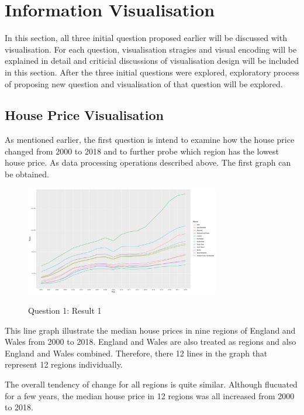 \documentclass{article}
\begin{document}
\section{Information Visualisation}
In this section, all three initial question proposed earlier will be discussed with visualisation. 
For each question, visualisation stragies and visual encoding will be explained in detail and 
criticial discussions of visualisation design will be included in this section. After the three initial 
questions were explored, exploratory process of proposing new question and visualisation of that question 
will be explored.

\subsection{House Price Visualisation}
As mentioned earlier, the first question is intend to examine how the house price changed from 2000 to 2018 
and to further probe which region has the lowest house price. As data processing operations described above. 
The first graph can be obtained.

\begin{figure}[htb]
  \begin{minipage}[b]{1.0\linewidth}
    \centering
    \centerline{\includegraphics[width=8.5cm]{Q1Geom_line}}
    \centerline{Question 1: Result 1}\medskip
  \end{minipage}
\end{figure}

This line graph illustrate the median house prices in nine regions of England and Wales from 2000 to 2018. 
England and Wales are also treated as regions and also England and Wales combined. Therefore, there 12 lines 
in the graph that represent 12 regions individually. 

The overall tendency of change for all regions is quite similar. Although flucuated for a few years, 
the median house price in 12 regions was all increased from 2000 to 2018.
\end{document}
